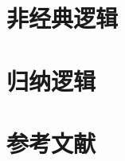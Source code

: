 \documentclass[a4paper,11pt,twoside]{book}
\begin{document}
\chapter{非经典逻辑}








\chapter{归纳逻辑}








\backmatter
\chapter*{参考文献}
\printbibliography
\end{document}
